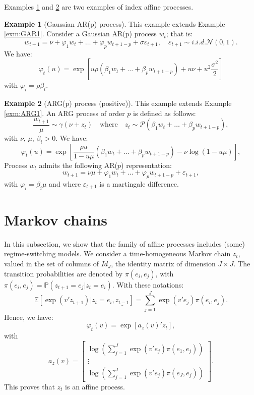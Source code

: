 \documentclass[
  12pt,
]{book}
\theoremstyle{definition}
\theoremstyle{definition}
\newtheorem{example}{Example}[chapter]
\theoremstyle{definition}
\theoremstyle{definition}
\theoremstyle{remark}
\begin{document}
Examples \ref{exm:ARp} and \ref{exm:ARGp} are two examples of index affine processes.

\begin{example}[Gaussian AR(p) process]
\protect\hypertarget{exm:ARp}{}\label{exm:ARp}This example extends Example \ref{exm:GAR1}. Consider a Gaussian AR(p) process \(w_t\); that is:
\[
w_{t+1} = \nu + \varphi_1 w_t +\dots+ \varphi_p w_{t+1-p}+\sigma \varepsilon_{t+1},\quad \varepsilon_{t+1} \sim i.i.d. \mathcal{N}(0,1).
\]
We have:
\[
\varphi_t(u) = \exp \left[ u \rho (\beta_1 w_t+\dots+\beta_p w_{t+1-p})+u\nu + u^2  \frac{\sigma^2}{2}\right]
\]
with \(\varphi_i = \rho \beta_i\).
\end{example}

\begin{example}[ARG(p) process (positive)]
\protect\hypertarget{exm:ARGp}{}\label{exm:ARGp}This example extends Example \ref{exm:ARG1}.
An ARG process of order \(p\) is defined as follows:
\[
\frac{w_{t+1}}{\mu} \sim \gamma(\nu+z_t) \quad \mbox{where} \quad z_t \sim \mathcal{P} \left( \beta_1 w_t+\dots+\beta_p w_{t+1-p} \right),
\]
with \(\nu\), \(\mu\), \(\beta_i > 0\). We have:
\[
\varphi_t(u) = \exp\left[\frac{\rho u}{1-u \mu} (\beta_1 w_t+\dots+\beta_p w_{t+1-p})-\nu  \log(1-u\mu)\right],
\]
Process \(w_t\) admits the following AR(\(p\)) representation:
\[
w_{t+1} = \nu\mu + \varphi_1 w_t +\dots+ \varphi_p w_{t+1-p}+\varepsilon_{t+1},
\]
with \(\varphi_i = \beta_i\mu\) and where \(\varepsilon_{t+1}\) is a martingale difference.
\end{example}

\hypertarget{Markov}{%
\section{Markov chains}\label{Markov}}

In this subsection, we show that the family of affine processes includes (some) regime-switching models. We consider a time-homogeneous Markov chain \(z_t\), valued in the set of columns of \(Id_J\), the identity matrix of dimension \(J \times J\). The transition probabilities are denoted by \(\pi(e_i, e_j)\), with \(\pi(e_i, e_j) = \mathbb{P}(z_{t+1}=e_j | z_t=e_i)\). With these notations:
\[
\mathbb{E}[\exp(v'z_{t+1})|z_t=e_i,\underline{z_{t-1}}] = \sum^J_{j=1} \exp(v'e_j)\pi (e_i, e_j).
\]
Hence, we have:
\[
\varphi_t(v) = \exp[a_z(v)'z_t],
\]
with
\[
a_z(v)= \left[ \begin{array}{c} \log \left(\sum^J_{j=1} \exp(v'e_j)  \pi(e_1,e_j)\right)\\
\vdots\\
\log \left(\sum^J_{j=1} \exp(v'e_j)  \pi(e_J,e_j)\right)
\end{array}\right].
\]
This proves that \(z_t\) is an affine process.
\end{document}
